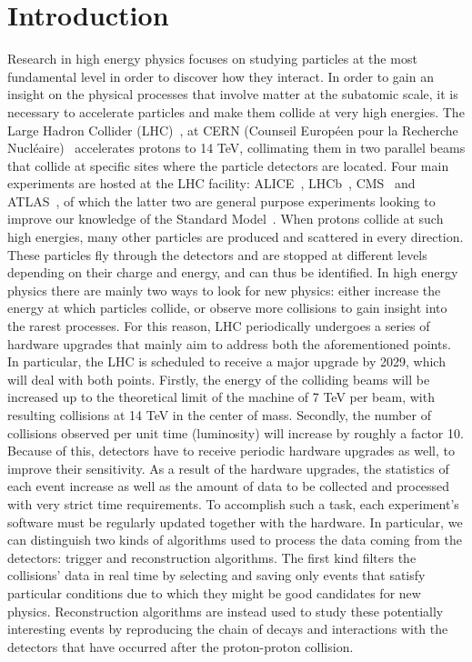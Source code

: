 \chapter*{Introduction}
Research in high energy physics focuses on studying particles at the most fundamental level in order to discover how they interact. In order to gain an insight on the physical processes that involve matter at the subatomic scale, it is necessary to accelerate particles and make them collide at very high energies. The Large Hadron Collider (LHC)~\cite{LHC}, at CERN (Counseil Européen pour la Recherche Nucléaire)~\cite{CERN} accelerates protons to 14 TeV, collimating them in two parallel beams that collide at specific sites where the particle detectors are located. Four main experiments are hosted at the LHC facility: ALICE~\cite{ALICE}, LHCb~\cite{LHCb}, CMS~\cite{CMS} and ATLAS~\cite{ATLAS}, of which the latter two are general purpose experiments looking to improve our knowledge of the Standard Model~\cite{standard_model}. When protons collide at such high energies, many other particles are produced and scattered in every direction. These particles fly through the detectors and are stopped at different levels depending on their charge and energy, and can thus be identified. In high energy physics there are mainly two ways to look for new physics: either increase the energy at which particles collide, or observe more collisions to gain insight into the rarest processes. For this reason, LHC periodically undergoes a series of hardware upgrades that mainly  aim to address both the aforementioned points. In particular, the LHC is scheduled to receive a major upgrade by 2029, which will deal with both points. Firstly, the energy of the colliding beams will be increased up to the theoretical limit of the machine of 7 TeV per beam, with resulting collisions at 14 TeV in the center of mass. Secondly, the number of collisions observed per unit time (luminosity) will increase by roughly a factor 10. Because of this, detectors have to receive periodic hardware upgrades as well, to improve their sensitivity. As a result of the hardware upgrades, the statistics of each event increase as well as the amount of data to be collected and processed with very strict time requirements. To accomplish such a task, each experiment's software must be regularly updated together with the hardware. In particular, we can distinguish two kinds of algorithms used to process the data coming from the detectors: trigger and reconstruction algorithms. The first kind filters the collisions' data in real time by selecting and saving only events that satisfy particular conditions due to which they might be good candidates for new physics. Reconstruction algorithms are instead used to study these potentially interesting events by reproducing the chain of decays and interactions with the detectors that have occurred after the proton-proton collision. \newline
